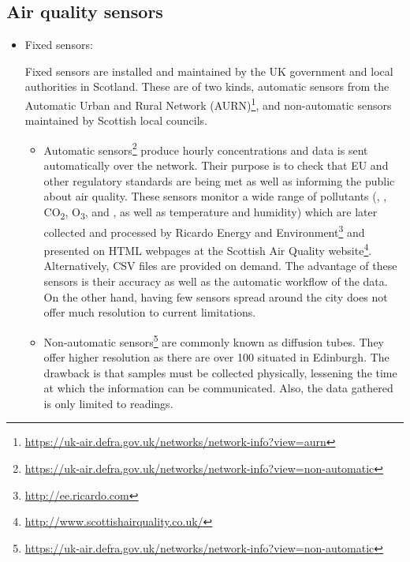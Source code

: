 \subsection{Air quality sensors}

\begin{itemize}

\item Fixed sensors: 

Fixed sensors are installed and maintained by the UK government and local authorities in Scotland. These are of two kinds, automatic sensors from the Automatic Urban and Rural Network (AURN)\footnote{\url{https://uk-air.defra.gov.uk/networks/network-info?view=aurn}}, and non-automatic sensors maintained by Scottish local councils.

	\begin{itemize}
    
    \item Automatic sensors\footnote{\url{https://uk-air.defra.gov.uk/networks/network-info?view=non-automatic}} produce hourly concentrations and data is sent automatically over the network. Their purpose is to check that EU and other regulatory standards are being met as well as informing the public about air quality. These sensors monitor a wide range of pollutants (\NOX, \SOTWO, CO\textsubscript{2}, O\textsubscript{3}, \PMTWO and \PMTEN, as well as temperature and humidity) which are later collected and processed by Ricardo Energy and Environment\footnote{\url{http://ee.ricardo.com}} and presented on HTML webpages at the Scottish Air Quality website\footnote{\url{http://www.scottishairquality.co.uk/}}. Alternatively, CSV files are provided on demand. The advantage of these sensors is their accuracy as well as the automatic workflow of the data. On the other hand, having few sensors spread around the city does not offer much resolution to current limitations. 
    \item Non-automatic sensors\footnote{\url{https://uk-air.defra.gov.uk/networks/network-info?view=non-automatic}} are commonly known as diffusion tubes. They offer higher resolution as there are over 100 situated in Edinburgh. The drawback is that samples must be collected physically, lessening the time at which the information can be communicated. Also, the data gathered is only limited to \NOTWO readings.
    \end{itemize}


\end{itemize}
